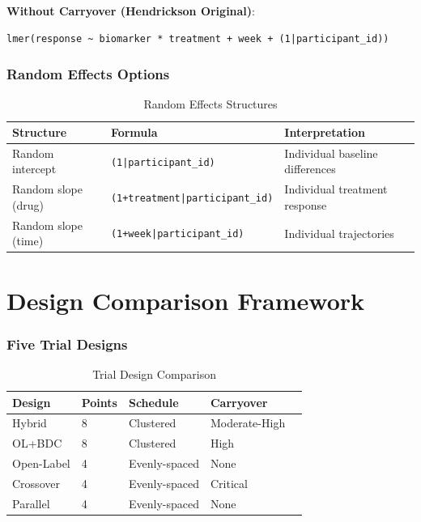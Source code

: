 \documentclass[11pt]{article}
\theoremstyle{definition}
\begin{document}
\textbf{Without Carryover (Hendrickson Original)}:
\begin{lstlisting}
lmer(response ~ biomarker * treatment + week + (1|participant_id))
\end{lstlisting}

\section{Random Effects Options}

\begin{table}[h]
\centering
\caption{Random Effects Structures}
\begin{tabular}{@{}lll@{}}
\toprule
\textbf{Structure} & \textbf{Formula} & \textbf{Interpretation} \\
\midrule
Random intercept & \texttt{(1|participant\_id)} & Individual baseline differences \\
Random slope (drug) & \texttt{(1+treatment|participant\_id)} & Individual treatment response \\
Random slope (time) & \texttt{(1+week|participant\_id)} & Individual trajectories \\
\bottomrule
\end{tabular}
\end{table}

\part{Design Comparison Framework}

\section{Five Trial Designs}

\begin{table}[h]
\centering
\caption{Trial Design Comparison}
\begin{tabular}{@{}lllll@{}}
\toprule
\textbf{Design} & \textbf{Points} & \textbf{Schedule} & \textbf{Carryover} \\
\midrule
Hybrid & 8 & Clustered & Moderate-High \\
OL+BDC & 8 & Clustered & High \\
Open-Label & 4 & Evenly-spaced & None \\
Crossover & 4 & Evenly-spaced & Critical \\
Parallel & 4 & Evenly-spaced & None \\
\bottomrule
\end{tabular}
\end{table}
\end{document}
